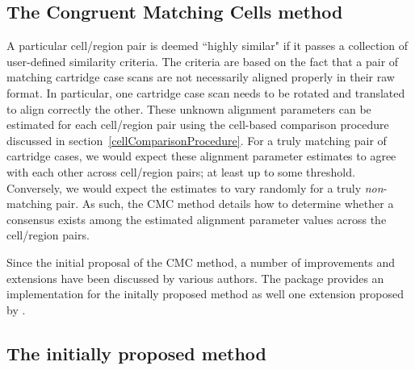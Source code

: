 %

\subsection{The Congruent Matching Cells method} \label{cmc_description}

A particular cell/region pair is deemed ``highly similar" if it passes a collection of user-defined similarity criteria. The criteria are based on the fact that a pair of matching cartridge case scans are not necessarily aligned properly in their raw format. In particular, one cartridge case scan needs to be rotated and translated to align correctly the other. These unknown alignment parameters can be estimated for each cell/region pair using the cell-based comparison procedure discussed in section~\ref{cellComparisonProcedure}. For a truly matching pair of cartridge cases, we would expect these alignment parameter estimates to agree with each other across cell/region pairs; at least up to some threshold. Conversely, we would expect the estimates to vary randomly for a truly \emph{non}-matching pair. As such, the CMC method details how to determine whether a consensus exists among the estimated alignment parameter values across the cell/region pairs.

Since the initial proposal of the CMC method, a number of improvements and extensions have been discussed by various authors. The  package provides an implementation for the initally proposed method as well one extension proposed by \citet{tong_improved_2015}.

\subsection{The initially proposed method} \label{initialMethod}

